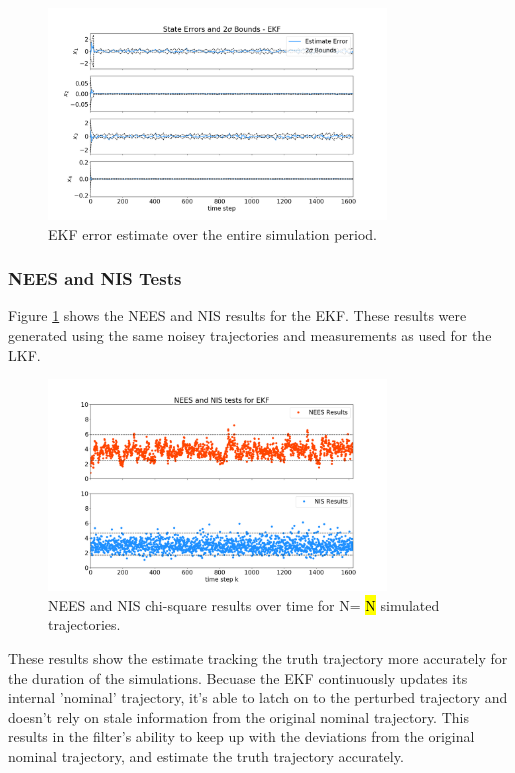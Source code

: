 \documentclass[11pt, a4paper]{article}
\begin{document}
\begin{figure}[H]
	\centering
	\includegraphics[width=0.8\textwidth]{Figures/ekf_estimate_th.png}
	\caption{EKF error estimate over the entire simulation period. }
	\label{fig:neesnis_ekf}
\end{figure}


\subsubsection{NEES and NIS Tests}
Figure \ref{fig:neesnis_ekf} shows the NEES and NIS results for the EKF.
These results were generated using the same noisey trajectories and measurements as used for the LKF. 

\begin{figure}[H]
	\centering
	\includegraphics[width=0.8\textwidth]{./Figures/NEESNIS_ekf.png}
	\caption{NEES and NIS chi-square results over time for N= \hl{N} simulated trajectories.}
	\label{fig:ekf_est}
\end{figure}

These results show the estimate tracking the truth trajectory more accurately for the duration of the simulations. 
Becuase the EKF continuously updates its internal 'nominal' trajectory, it's able to latch on to the perturbed trajectory and doesn't rely on stale information from the original nominal trajectory. 
This results in the filter's ability to keep up with the deviations from the original nominal trajectory, and estimate the truth trajectory accurately.
\end{document}
